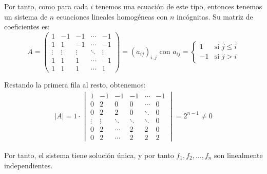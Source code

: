 \begin{ejercicio}
    Por tanto, como para cada $i$ tenemos una ecuación de este tipo, entonces tenemos un sistema de $n$ ecuaciones lineales homogéneas con $n$ incógnitas. Su matriz de coeficientes es:
    \begin{equation*}
        A=\begin{pmatrix}
            1 & -1 & -1 & \cdots & -1\\
            1 & 1 & -1 & \cdots & -1\\
            \vdots & \vdots & \vdots & \ddots & \vdots\\
            1 & 1 & 1 & \cdots & -1\\
            1 & 1 & 1 & \cdots & 1
        \end{pmatrix}=(a_{ij})_{i,j}
        \text{ con } a_{ij}=\begin{cases}
            1 & \text{si } j\leq i\\
            -1 & \text{si } j>i
        \end{cases}
    \end{equation*}

    Restando la primera fila al resto, obtenemos:
    \begin{align*}
        |A|=1\cdot \begin{vmatrix}
            1 & -1 & -1 & -1 & \cdots & -1\\
            0 & 2 & 0 & 0 & \cdots & 0\\
            0 & 2 & 2 & 0 & \ddots & 0\\
            \vdots & \vdots & \ddots & \ddots & \ddots & 0\\
            0 & 2 & \cdots & 2 & 2 & 0 \\
            0 & 2 & \cdots & 2 & 2 & 2
        \end{vmatrix}=2^{n-1}\neq 0
    \end{align*}

    Por tanto, el sistema tiene solución única, y por tanto $f_1,f_2,\dots,f_n$ son linealmente independientes.
\end{ejercicio}

